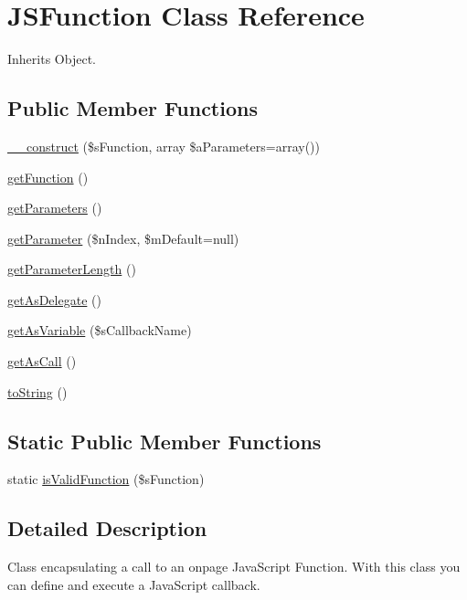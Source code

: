 \hypertarget{class_j_s_function}{\section{J\-S\-Function Class Reference}
\label{class_j_s_function}
}


Inherits Object.

\subsection*{Public Member Functions}
\begin{DoxyCompactItemize}
\item 
\hyperlink{class_j_s_function_a3eff8017c95b8d506b5681059146a622}{\-\_\-\-\_\-construct} (\$s\-Function, array \$a\-Parameters=array())
\item 
\hyperlink{class_j_s_function_a6b3f79ff3c91a373799474eb34b7e66d}{get\-Function} ()
\item 
\hyperlink{class_j_s_function_ac64109018bb50dd46daa4edb9f64dee8}{get\-Parameters} ()
\item 
\hyperlink{class_j_s_function_afa6f628d619faf5430e20cd48a37d195}{get\-Parameter} (\$n\-Index, \$m\-Default=null)
\item 
\hyperlink{class_j_s_function_a27551e888b7a1be5acbcf53ced73b402}{get\-Parameter\-Length} ()
\item 
\hyperlink{class_j_s_function_ac6e0fe0bfa0b910bed8c4c49bc6232c4}{get\-As\-Delegate} ()
\item 
\hyperlink{class_j_s_function_a0474531891a84bbfcb91f0b1b798c98a}{get\-As\-Variable} (\$s\-Callback\-Name)
\item 
\hyperlink{class_j_s_function_a9d71e63e6f1e8ce69c42450fc8c64600}{get\-As\-Call} ()
\item 
\hyperlink{class_j_s_function_a87ff9cd433c24738e62f68ea28b1c0df}{to\-String} ()
\end{DoxyCompactItemize}
\subsection*{Static Public Member Functions}
\begin{DoxyCompactItemize}
\item 
static \hyperlink{class_j_s_function_ae4c32fc6bd754da66c4cbe0290065257}{is\-Valid\-Function} (\$s\-Function)
\end{DoxyCompactItemize}


\subsection{Detailed Description}
Class encapsulating a call to an onpage Java\-Script Function. With this class you can define and execute a Java\-Script callback.

